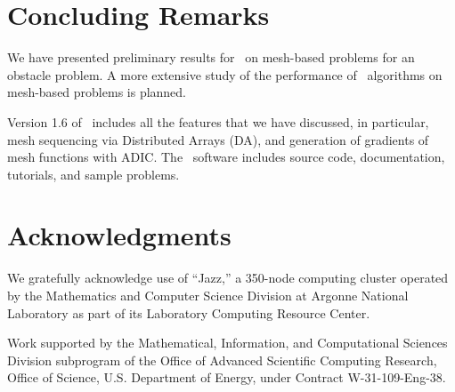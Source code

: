 
\section{Concluding Remarks}

We have presented preliminary results for \tao\ on
mesh-based problems for an obstacle problem. 
A more extensive study
of the performance of \tao\ algorithms on mesh-based
problems is planned.

Version 1.6 of \tao\ includes all the features
that we have discussed, in particular,
mesh sequencing via Distributed Arrays (DA),
and generation of gradients of mesh functions with ADIC.
The \tao\ software \cite{tao-home} includes
source code, documentation, tutorials, and sample problems.

\section*{Acknowledgments}

We gratefully acknowledge use of ``Jazz,'' a 350-node computing 
cluster operated by the Mathematics and Computer Science Division at 
Argonne National Laboratory as part of its Laboratory Computing Resource 
Center.

Work supported by the Mathematical, Information, and
Computational Sciences Division subprogram of the Office of Advanced
Scientific Computing Research,  Office of Science, 
U.S. Department of Energy, under Contract
W-31-109-Eng-38.




